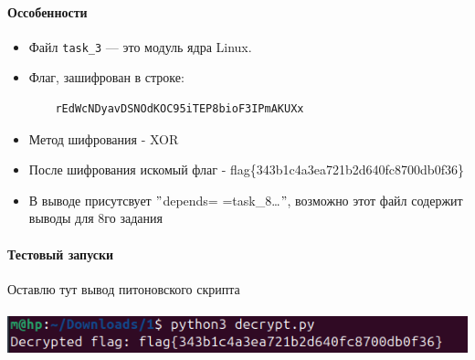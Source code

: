 \noindent

\paragraph{Оссобенности}
\begin{itemize}
    \item Файл \texttt{task\_3} — это модуль ядра Linux.
    \item Флаг, зашифрован в строке:
    \begin{verbatim}
    rEdWcNDyavDSNOdKOC95iTEP8bioF3IPmAKUXx
    \end{verbatim}
    \item Метод шифрования - XOR
    \item После шифрования искомый флаг - flag\{343b1c4a3ea721b2d640fc8700db0f36\}
    \item В выводе присутсвует \("\)depends= \ldotsname=task\_8\ldots\("\), возможно этот файл содержит выводы для 8го задания
\end{itemize}

\paragraph{Тестовый запуски}
Оставлю тут вывод питоновского скрипта

\paragraph{}
\includegraphics[width=1\linewidth]{static/solution_task_3}
